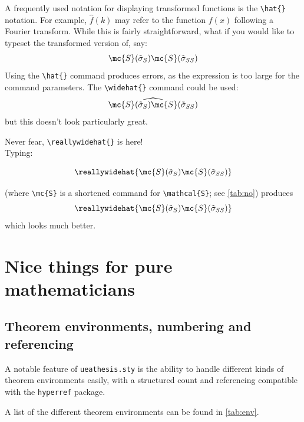 A frequently used notation for displaying transformed functions is the \verb|\hat{}| notation. For example, $\hat{f}(k)$ may refer to the function $f(x)$ following a Fourier transform. While this is fairly straightforward, what if you would like to typeset the transformed version of, say:
\[\mc{S}(\tilde{\sigma}_S)\mc{S}(\tilde{\sigma}_{SS}) \]
 Using the \verb|\hat{}| command produces errors, as the expression is too large for the command parameters. The \verb|\widehat{}| command could be used:
\[ \widehat{\mc{S}(\tilde{\sigma}_S)\mc{S}(\tilde{\sigma}_{SS})}\]
but this doesn't look particularly great.

Never fear, \verb|\reallywidehat{}| is here! \\
Typing:
\begin{small}
\begin{spverbatim}
\[ \reallywidehat{\mc{S}(\tilde{\sigma}_S)\mc{S}(\tilde{\sigma}_{SS})} \]
\end{spverbatim}
\end{small}
(where \verb|\mc{S}| is a shortened command for \verb|\mathcal{S}|; see \autoref{tab:no}) produces
\[ \reallywidehat{\mc{S}(\tilde{\sigma}_S)\mc{S}(\tilde{\sigma}_{SS})} \]
which looks much better.




\section{Nice things for pure mathematicians}

\subsection{Theorem environments, numbering and referencing}{\label{ssec:thme}}

A notable feature of \verb|ueathesis.sty| is the ability to handle different kinds of theorem environments easily, with a structured count and referencing compatible with the \verb|hyperref| package. 

A list of the different theorem environments can be found in \autoref{tab:env}. 

